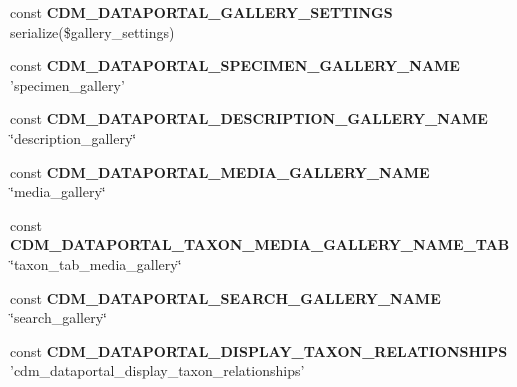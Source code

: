 \begin{DoxyCompactItemize}
\item 
\hypertarget{settings_8php_a20a7530a52fba59e6acc0234d5cc7f9c}{const {\bfseries C\-D\-M\-\_\-\-D\-A\-T\-A\-P\-O\-R\-T\-A\-L\-\_\-\-G\-A\-L\-L\-E\-R\-Y\-\_\-\-S\-E\-T\-T\-I\-N\-G\-S} serialize(\$gallery\-\_\-settings)}\label{settings_8php_a20a7530a52fba59e6acc0234d5cc7f9c}

\item 
\hypertarget{settings_8php_ace5ec0dc5f1b56bfb78be3c547f5f37a}{const {\bfseries C\-D\-M\-\_\-\-D\-A\-T\-A\-P\-O\-R\-T\-A\-L\-\_\-\-S\-P\-E\-C\-I\-M\-E\-N\-\_\-\-G\-A\-L\-L\-E\-R\-Y\-\_\-\-N\-A\-M\-E} 'specimen\-\_\-gallery'}\label{settings_8php_ace5ec0dc5f1b56bfb78be3c547f5f37a}

\item 
\hypertarget{settings_8php_aee992b83cdd65431c4b2fcc3bbc335f2}{const {\bfseries C\-D\-M\-\_\-\-D\-A\-T\-A\-P\-O\-R\-T\-A\-L\-\_\-\-D\-E\-S\-C\-R\-I\-P\-T\-I\-O\-N\-\_\-\-G\-A\-L\-L\-E\-R\-Y\-\_\-\-N\-A\-M\-E} \char`\"{}description\-\_\-gallery\char`\"{}}\label{settings_8php_aee992b83cdd65431c4b2fcc3bbc335f2}

\item 
\hypertarget{settings_8php_afbc5db0c766674e0e33014493f1f1138}{const {\bfseries C\-D\-M\-\_\-\-D\-A\-T\-A\-P\-O\-R\-T\-A\-L\-\_\-\-M\-E\-D\-I\-A\-\_\-\-G\-A\-L\-L\-E\-R\-Y\-\_\-\-N\-A\-M\-E} \char`\"{}media\-\_\-gallery\char`\"{}}\label{settings_8php_afbc5db0c766674e0e33014493f1f1138}

\item 
\hypertarget{settings_8php_ab263781121d1c50a0ea394c6a93f8940}{const {\bfseries C\-D\-M\-\_\-\-D\-A\-T\-A\-P\-O\-R\-T\-A\-L\-\_\-\-T\-A\-X\-O\-N\-\_\-\-M\-E\-D\-I\-A\-\_\-\-G\-A\-L\-L\-E\-R\-Y\-\_\-\-N\-A\-M\-E\-\_\-\-T\-A\-B} \char`\"{}taxon\-\_\-tab\-\_\-media\-\_\-gallery\char`\"{}}\label{settings_8php_ab263781121d1c50a0ea394c6a93f8940}

\item 
\hypertarget{settings_8php_a8b9e567eae20d6f1c41f113c0c898411}{const {\bfseries C\-D\-M\-\_\-\-D\-A\-T\-A\-P\-O\-R\-T\-A\-L\-\_\-\-S\-E\-A\-R\-C\-H\-\_\-\-G\-A\-L\-L\-E\-R\-Y\-\_\-\-N\-A\-M\-E} \char`\"{}search\-\_\-gallery\char`\"{}}\label{settings_8php_a8b9e567eae20d6f1c41f113c0c898411}

\item 
\hypertarget{settings_8php_a1fb137a3202b50e5c4a3649b06f169d9}{const {\bfseries C\-D\-M\-\_\-\-D\-A\-T\-A\-P\-O\-R\-T\-A\-L\-\_\-\-D\-I\-S\-P\-L\-A\-Y\-\_\-\-T\-A\-X\-O\-N\-\_\-\-R\-E\-L\-A\-T\-I\-O\-N\-S\-H\-I\-P\-S} 'cdm\-\_\-dataportal\-\_\-display\-\_\-taxon\-\_\-relationships'}\label{settings_8php_a1fb137a3202b50e5c4a3649b06f169d9}


\end{DoxyCompactItemize}
